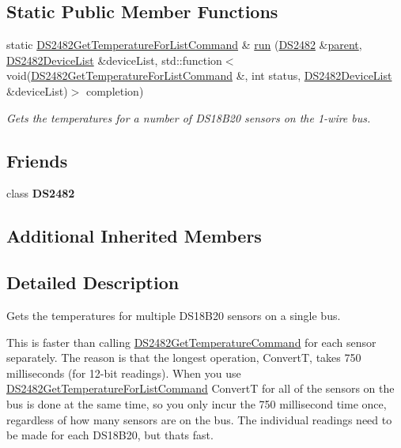 \subsection*{Static Public Member Functions}
\begin{DoxyCompactItemize}
\item 
static \mbox{\hyperlink{class_d_s2482_get_temperature_for_list_command}{D\+S2482\+Get\+Temperature\+For\+List\+Command}} \& \mbox{\hyperlink{class_d_s2482_get_temperature_for_list_command_ad0895d68b4409b157891b751e740b4fe}{run}} (\mbox{\hyperlink{class_d_s2482}{D\+S2482}} \&\mbox{\hyperlink{class_d_s2482_command_a54a41fb8a610ef2077f5e5377771aaf3}{parent}}, \mbox{\hyperlink{class_d_s2482_device_list}{D\+S2482\+Device\+List}} \&device\+List, std\+::function$<$ void(\mbox{\hyperlink{class_d_s2482_get_temperature_for_list_command}{D\+S2482\+Get\+Temperature\+For\+List\+Command}} \&, int status, \mbox{\hyperlink{class_d_s2482_device_list}{D\+S2482\+Device\+List}} \&device\+List)$>$ completion)
\begin{DoxyCompactList}\small\item\em Gets the temperatures for a number of D\+S18\+B20 sensors on the 1-\/wire bus. \end{DoxyCompactList}\end{DoxyCompactItemize}
\subsection*{Friends}
\begin{DoxyCompactItemize}
\item 
\mbox{\label{class_d_s2482_get_temperature_for_list_command_afeaf69274324e8dbeebede05c02d9c18}} 
class {\bfseries D\+S2482}
\end{DoxyCompactItemize}
\subsection*{Additional Inherited Members}


\subsection{Detailed Description}
Gets the temperatures for multiple D\+S18\+B20 sensors on a single bus. 

This is faster than calling \mbox{\hyperlink{class_d_s2482_get_temperature_command}{D\+S2482\+Get\+Temperature\+Command}} for each sensor separately. The reason is that the longest operation, ConvertT, takes 750 milliseconds (for 12-\/bit readings). When you use \mbox{\hyperlink{class_d_s2482_get_temperature_for_list_command}{D\+S2482\+Get\+Temperature\+For\+List\+Command}} ConvertT for all of the sensors on the bus is done at the same time, so you only incur the 750 millisecond time once, regardless of how many sensors are on the bus. The individual readings need to be made for each D\+S18\+B20, but that\textquotesingle{}s fast.

